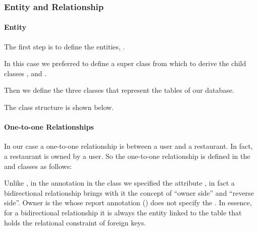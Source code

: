 \subsubsection{Entity and Relationship}

\paragraph{Entity}

The first step is to define the entities, .

In this case we preferred to define a super class  from which to
derive the child classes ,  and .



Then we define the three classes that represent the tables of our database.

The class structure is shown below.







\paragraph{One-to-one Relationships}

In our case a one-to-one relationship is between a user and a restaurant. In
fact, a restaurant is owned by a user. So the one-to-one relationship is defined
in the  and  classes as follows:





Unlike , in the annotation  in the 
class we specified the attribute , in fact a bidirectional
relationship brings with it the concept of ``owner side'' and ``reverse side''.
Owner is the  whose report annotation () does not
specify the .  In essence, for a bidirectional relationship it is
always the entity linked to the table that holds the relational constraint of
foreign keys.

